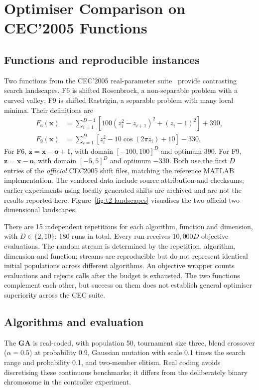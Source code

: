 \section{Optimiser Comparison on CEC'2005 Functions}
\label{sec:t2-cec}

\subsection{Functions and reproducible instances}
Two functions from the CEC'2005 real-parameter suite~\cite{suganthan2005} provide contrasting
search landscapes. F6 is shifted Rosenbrock, a non-separable problem with a curved valley;
F9 is shifted Rastrigin, a separable problem with many local minima. Their definitions are
\begin{align}
F_6(\mathbf{x}) &= \sum_{i=1}^{D-1}[100(z_i^2-z_{i+1})^2+(z_i-1)^2]+390,\\
F_9(\mathbf{x}) &= \sum_{i=1}^{D}[z_i^2-10\cos(2\pi z_i)+10]-330.
\end{align}
For F6, $\mathbf{z}=\mathbf{x}-\mathbf{o}+1$, with domain $[-100,100]^D$ and optimum 390.
For F9, $\mathbf{z}=\mathbf{x}-\mathbf{o}$, with domain $[-5,5]^D$ and optimum $-330$.
Both use the first $D$ entries of the \emph{official} CEC2005 shift files, matching the reference
MATLAB implementation. The vendored data include source attribution and checksums; earlier
experiments using locally generated shifts are archived and are not the results reported here.
Figure~\ref{fig:t2-landscapes} visualises the two official two-dimensional landscapes.

There are 15 independent repetitions for each algorithm, function and dimension, with
$D\in\{2,10\}$: 180 runs in total. Every run receives $10,000D$ objective evaluations.
The random stream is determined by the repetition, algorithm, dimension and function; streams
are reproducible but do not represent identical initial populations across different algorithms.
An objective wrapper counts evaluations and rejects calls after the budget is exhausted.
The two functions complement each other, but success on them does not establish general
optimiser superiority across the CEC suite.

\subsection{Algorithms and evaluation}
The \textbf{GA} is real-coded, with population 50, tournament size three, blend crossover
($\alpha=0.5$) at probability 0.9, Gaussian mutation with scale 0.1 times the search range and
probability 0.1, and two-member elitism. Real coding avoids discretising these continuous
benchmarks; it differs from the deliberately binary chromosome in the controller experiment.

